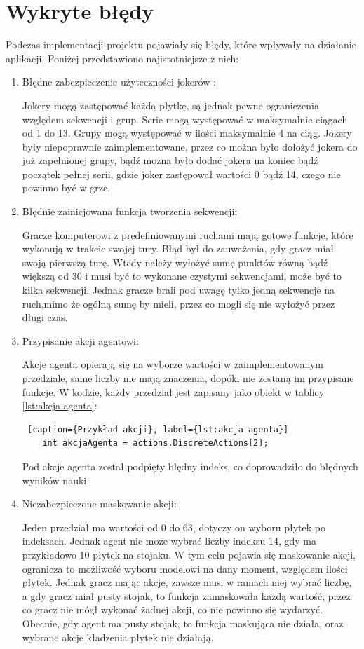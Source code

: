 \documentclass[a4paper,twoside,12pt]{book}
\begin{document}
	\section{Wykryte błędy}
	Podczas implementacji projektu pojawiały się błędy, które wpływały na działanie aplikacji. Poniżej przedstawiono najistotniejsze z nich:
	\begin{enumerate}
		\item Błędne zabezpieczenie użyteczności jokerów :
		
		Jokery mogą zastępować każdą płytkę, są jednak pewne ograniczenia względem sekwencji i grup. Serie mogą występować w maksymalnie ciągach od 1 do 13. Grupy mogą występować w ilości maksymalnie 4 na ciąg. Jokery były niepoprawnie zaimplementowane, przez co można było dołożyć jokera do już zapełnionej grupy, bądź można było dodać jokera na koniec bądź początek pełnej serii, gdzie joker zastępował wartości 0 bądź 14, czego nie powinno być w grze. 
		
		\item Błędnie zainicjowana funkcja tworzenia sekwencji:
		
		Gracze komputerowi z predefiniowanymi ruchami mają gotowe funkcje, które wykonują w trakcie swojej tury. Błąd był do zauważenia, gdy gracz miał swoją pierwszą turę. Wtedy należy wyłożyć sumę punktów równą bądź większą od 30 i musi być to wykonane czystymi sekwencjami, może być to kilka sekwencji. Jednak gracze brali pod uwagę tylko jedną sekwencje na ruch,mimo że ogólną sumę by mieli, przez co mogli się nie wyłożyć przez długi czas.
		
		\item Przypisanie akcji agentowi:
		
		Akcje agenta opierają się na wyborze wartości w zaimplementowanym przedziale, same liczby nie mają znaczenia, dopóki nie zostaną im przypisane funkcje. W kodzie, każdy przedział jest zapisany jako obiekt w tablicy \ref{lst:akcja agenta}:
		\begin{lstlisting} [caption={Przykład akcji}, label={lst:akcja agenta}]
	int akcjaAgenta = actions.DiscreteActions[2];
		\end{lstlisting}
		Pod akcje agenta został podpięty błędny indeks, co doprowadziło do błędnych wyników nauki.
		
		\item Niezabezpieczone maskowanie akcji:
		
		Jeden przedział ma wartości od 0 do 63, dotyczy on wyboru płytek po indeksach. Jednak agent nie może wybrać liczby indeksu 14, gdy ma przykładowo 10 płytek na stojaku. W tym celu pojawia się maskowanie akcji, ogranicza to możliwość wyboru modelowi na dany moment, względem ilości płytek. Jednak gracz mając akcje, zawsze musi w ramach niej wybrać liczbę, a gdy gracz miał pusty stojak, to funkcja zamaskowała każdą wartość, przez co gracz nie mógł wykonać żadnej akcji, co nie powinno się wydarzyć. Obecnie, gdy agent ma pusty stojak, to funkcja maskująca nie działa, oraz wybrane akcje kładzenia płytek nie działają.
	\end{enumerate}
		
\end{document}
